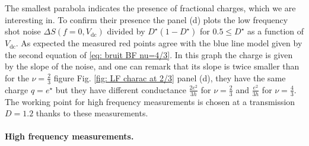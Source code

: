 The smallest parabola indicates the presence of fractional charges, which we are interesting in. 
To confirm their presence the panel (d) plots the low frequency shot noise $\Delta S\left(f=0,V_{\mathrm{dc}}\right)$ divided by $D^{\star}\left(1-D^{\star}\right)$ for $0.5 \leq D^{\star}$ as a function of $V_{\mathrm{dc}}$.
As expected the measured red points agree with the blue line model given by the second equation of \eqref{eq: bruit BF nu=4/3}.
In this graph the charge is given by the slope of the noise, and one can remark that its slope is twice smaller than for the $\nu = \frac{2}{3}$ figure Fig. \ref{fig: LF charac at 2/3} panel (d), they have the same charge $q = e^{\star}$ but they have different conductance $\frac{2e^{2}}{3h}$ for $\nu = \frac{2}{3}$ and $\frac{e^{2}}{3h}$ for $\nu = \frac{4}{3}$.
The working point for high frequency measurements is chosen at a transmission $D = 1.2$ thanks to these measurements.

\paragraph*{High frequency measurements.}

